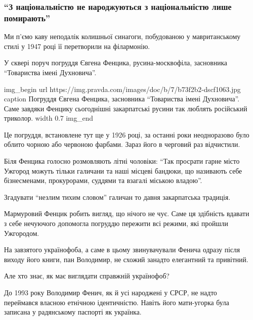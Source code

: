  
 
 

\subsubsection{\enquote{З національністю не народжуються \dshM з національністю лише
помирають}}

Ми п’ємо каву неподалік колишньої синагоги, побудованою у мавританському стилі \dshM у 1947 році її перетворили на філармонію.

У сквері поруч \dshM погруддя Євгена Фенцика, русина-москвофіла, засновника
\enquote{Товариства імені Духновича}.

\ifcmt
img_begin 
        url https://img.pravda.com/images/doc/b/7/b73f2b2-dscf1063.jpg
        caption Погруддя Євгена Фенцика, засновника \enquote{Товариства імені Духновича}. Саме завдяки Фенцику сьогоднішні закарпатські русини так люблять російський триколор.
        width 0.7
img_end
\fi

Це погруддя, встановлене тут ще у 1926 році, за останні роки неодноразово було
облито чорною або червоною фарбами. Зараз його в черговий раз відчистили.

Біля Фенцика голосно розмовляють літні чоловіки: \enquote{Так просрати гарне місто
Ужгород можуть тільки галичани та наші місцеві бандюки, що називають себе
бізнесменами, прокурорами, суддями та взагалі міською владою}.

Згадувати \enquote{незлим тихим словом} галичан \dshM то давня закарпатська традиція.

Мармуровий Фенцик робить вигляд, що нічого не чує. Саме ця здібність вдавати з
себе нечуючого допомогла погруддю пережити всі режими, які пройшли Ужгородом.

На завзятого українофоба, а саме в цьому звинувачували Фенича одразу після
виходу його книги, пан Володимир, не схожий \dshM занадто елегантний та привітний.

Але хто знає, як має виглядати справжній українофоб?

До 1993 року Володимир Фенич, як й усі народжені у СРСР, не надто переймався
власною етнічною ідентичністю. Навіть його мати-угорка була записана у
радянському паспорті як українка. 

